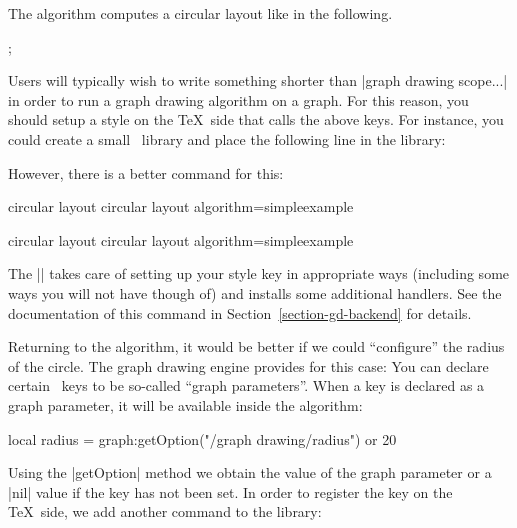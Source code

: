 The algorithm computes a circular layout like in the following.

\begin{codeexample}[]
\tikz [graph drawing scope, /graph drawing/algorithm=simpleexample]
  ;
\end{codeexample}

Users will typically wish to write something shorter than
|graph drawing scope...| in order to run a graph drawing algorithm on
a graph. For this reason, you should setup a style on the \TeX\ side
that calls the above keys. For instance, you could create a small
\tikzname\ library and place the following line in the library:
\begin{codeexample}
\end{codeexample}
However, there is a better command for this:
\begin{codeexample}[code only]
\pgfgddeclarealgorithmkey
{circular layout}
{circular layout}
{algorithm=simpleexample}
{}
\end{codeexample}
\pgfgddeclarealgorithmkey
{circular layout}
{circular layout}
{algorithm=simpleexample}
{}

The |\pgfgddeclarealgorithmkey| takes care of setting up your style
key in appropriate ways (including some ways you will not have though
of) and installs some additional handlers. See the documentation of
this command in Section~\ref{section-gd-backend} for details. 

Returning to the algorithm, it would be better if we could
``configure'' the radius of the circle. The graph drawing engine
provides for this case: You can declare certain \pgfname\ keys to be
so-called ``graph parameters''. When a key is declared as a graph
parameter, it will be available inside the algorithm: 

\begin{codeexample}
   local radius = graph:getOption("/graph drawing/radius") or 20
\end{codeexample}

Using the |getOption| method we obtain the value of the
graph parameter or a |nil| value if the key has not been set. In order
to register the key on the \TeX\ side, we add another command to the
library: 

\begin{codeexample}
\end{codeexample}

